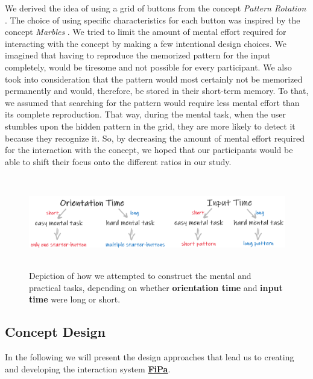 We derived the idea of using a grid of buttons from the concept \textit{Pattern Rotation} \cite{patternRotation, anonymous}. The choice of using specific characteristics for each button was inspired by the concept \textit{Marbles} \cite{patternRotation, anonymous}. We tried to limit the amount of mental effort required for interacting with the concept by making a few intentional design choices. We imagined that having to reproduce the memorized pattern for the input completely, would be tiresome and not possible for every participant. We also took into consideration that the pattern would most certainly not be memorized permanently and would, therefore, be stored in their short-term memory. To that, we assumed that searching for the pattern would require less mental effort than its complete reproduction. That way, during the mental task, when the user stumbles upon the hidden pattern in the grid, they are more likely to detect it because they recognize it. So, by decreasing the amount of mental effort required for the interaction with the concept, we hoped that our participants would be able to shift their focus onto the different ratios in our study.

\begin{figure}[t!]
\centering
\includegraphics[width=13cm, height=4cm]{Chapters/graphics/OriInput.PNG}
\caption{Depiction of how we attempted to construct the mental and practical tasks, depending on whether \textbf{orientation time} and \textbf{input time} were long or short.}
\label{fig:orientation_input}
\end{figure}


\subsection{Concept Design} \label{4.2.2}
In the following we will present the design approaches that lead us to creating and developing the interaction system \underline{\textbf{FiPa}}.

